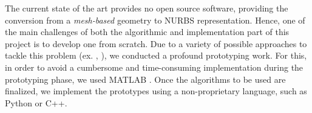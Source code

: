The current state of the art provides no open source software, providing the conversion from a \textit{mesh-based} geometry to NURBS representation. Hence, one of the main challenges of both the algorithmic and implementation part of this project is to develop one from scratch. Due to a variety of possible approaches to tackle this problem (ex. \cite{becker2011advanced},\cite{eck1996automatic} ), we conducted a profound prototyping work. For this, in order to avoid a cumbersome and time-consuming implementation during the prototyping phase, we used MATLAB \cite{MATLAB}. Once the algorithms to be used are finalized, we implement the prototypes using a non-proprietary language, such as Python or C++.